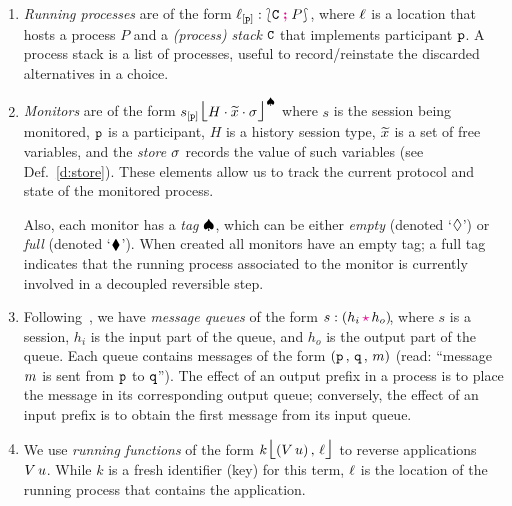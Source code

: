 \documentclass[runningheads]{llncs}
\newcommand{\erase}[1]{#1}
\begin{document}
\begin{enumerate}[$\bullet$]
\item \emph{Running processes} are of the form $\ell_{[\mathtt{p}]}:\lbag \mathtt{C} \; \textcolor{magenta}{\textbf{;}}\; P \rbag$, where $\ell$ is a location that 
hosts a process $P$ \erase{ and a \emph{(process) stack} $\mathtt{C}$} that implements participant $\mathtt{p}$.
\erase{A process stack is a list of processes, useful 
  to record/reinstate the discarded alternatives   in a choice.}

\item \emph{Monitors} are of the form ${s_{[\mathtt{p}]}\mbox{{\Large $\lfloor$}} \textcolor{black}{H}\cdot \widetilde{x}\cdot \sigma \mbox{{\Large $\rfloor$}}^{\spadesuit}}$ 
where 
$s$ is the session being monitored, 
$\mathtt{p}$ is a participant,
$H$ is a history session type, 
$\widetilde{x}$ is a set of free variables, 
and the \emph{store} $\sigma$  records the value of such variables (see Def.~\ref{d:store}).
These elements allow us to track the current protocol
and  state of the   monitored process.

Also, each monitor has a 
\emph{tag} $\spadesuit$, which can be either \emph{empty} (denoted `$\lozenge$') or \emph{full} (denoted `$\blacklozenge$'). 
When created all monitors have an empty tag; a full tag indicates that the running process associated to the monitor
is currently involved in a  decoupled reversible step.


\item Following~\cite{DBLP:journals/mscs/KouzapasYHH16}, we have \emph{message queues}
of the form 
$\codah{s}{h_i}{h_o}$,
where $s$ is a session, $h_i$ is the input part of the queue, and $h_o$ is the output part of the queue.
Each queue contains messages of the form $(\mathtt{p} \,,\, \mathtt{q} \,,\,m)$ (read: ``message $m$ is sent from $\mathtt{p}$ to $\mathtt{q}$'').
The effect of an output prefix in a process is to place the message in its corresponding output queue;
conversely, the effect of an input prefix is to obtain the first message from its input queue. 


\item We use \emph{running functions} of the form $k\mbox{{\Large $\lfloor$}} (V\, {u})\,,\, \ell \mbox{{\Large $\rfloor$}}$ to reverse
 applications $V\, {u}$. While $k$ is a fresh identifier (key) for this term, $\ell$ is the location of 
the running process that contains the application.

\end{enumerate}
\end{document}
